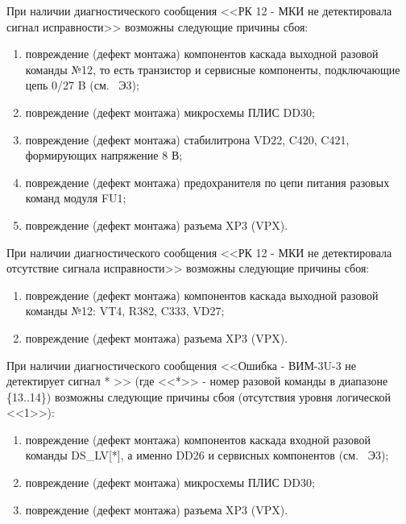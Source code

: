     \subpoint При наличии диагностического сообщения <<РК 12 - МКИ не детектировала сигнал исправности>> возможны следующие причины сбоя:
	\begin{enumerate}
	  \item повреждение (дефект монтажа) компонентов каскада выходной разовой команды №12, 
		то есть транзистор и сервисные компоненты, подключающие цепь 0/27 B (см. \DocProductSignature~Э3);
	  \item повреждение (дефект монтажа) микросхемы ПЛИС DD30;
	  \item повреждение (дефект монтажа) стабилитрона VD22, C420, C421, формирующих напряжение 8 В;
	  \item повреждение (дефект монтажа) предохранителя по цепи питания разовых команд модуля FU1;
	  \item повреждение (дефект монтажа) разъема XP3 (VPX).
	\end{enumerate} 
	
    \subpoint При наличии диагностического сообщения <<РК 12 - МКИ не детектировала отсутствие сигнала исправности>> возможны следующие причины сбоя:
	\begin{enumerate}
	  \item повреждение (дефект монтажа) компонентов каскада выходной разовой команды №12: VT4, R382, C333, VD27;
	  \item повреждение (дефект монтажа) разъема XP3 (VPX).
	\end{enumerate}
      
    \subpoint При наличии диагностического сообщения <<Ошибка - ВИМ-3U-3 не детектирует сигнал * >> 
	      (где <<*>> - номер разовой команды в диапазоне \{13..14\}) возможны следующие причины сбоя (отсутствия уровня логической <<1>>):
	\label{subdefects:rk_lv_fault_unexpected0}
	\begin{enumerate}
	  \item повреждение (дефект монтажа) компонентов каскада входной разовой команды DS\_LV[*], 
		а именно DD26 и сервисных компонентов (см. \DocProductSignature~Э3);
	  \item повреждение (дефект монтажа) микросхемы ПЛИС DD30;
	  \item повреждение (дефект монтажа) разъема XP3 (VPX).
	\end{enumerate}	
	
